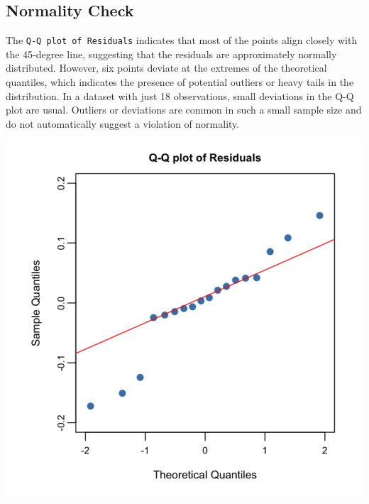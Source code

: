 \documentclass[
  11pt,
]{article}
\begin{document}
\vspace{-1em}

\subsection{Normality Check}\label{normality-check}

\noindent

\begin{minipage}{0.65\textwidth}
\justifying
\vspace{-3.5em}
The \texttt{Q-Q plot of Residuals} indicates that most of the points align closely with the 45-degree line, suggesting that the residuals are approximately normally distributed. However, six points deviate at the extremes of the theoretical quantiles, which indicates the presence of potential outliers or heavy tails in the distribution. In a dataset with just 18 observations, small deviations in the Q-Q plot are usual. Outliers or deviations are common in such a small sample size and do not automatically suggest a violation of normality.
\end{minipage}
\hfill
\begin{minipage}{0.33\textwidth}
\centering
\vspace{-2em}  %
\includegraphics[width=0.9\linewidth]{qqplot_residuals.png}
\vspace{-1em}     %
\end{minipage}
\end{document}
